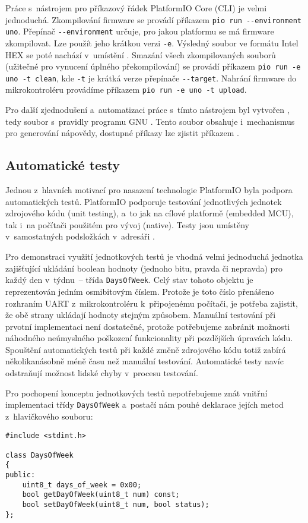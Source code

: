 Práce s~nástrojem pro příkazový řádek PlatformIO Core (CLI) je velmi
jednoduchá. Zkompilování firmware se provádí příkazem
\verb|pio run --environment uno|. Přepínač \verb|--environment| určuje,
pro jakou platformu se má firmware zkompilovat. Lze použít jeho krátkou verzi
\verb|-e|. Výsledný soubor ve formátu Intel HEX se poté nachází v~umístění
. Smazání všech zkompilovaných souborů
(užitečné pro vynucení úplného překompilování) se provádí příkazem
\verb|pio run -e uno -t clean|, kde \verb|-t| je krátká verze přepínače
\verb|--target|. Nahrání firmware do mikrokontroléru provádíme příkazem
\verb|pio run -e uno -t upload|.

Pro další zjednodušení a~automatizaci práce s~tímto nástrojem byl vytvořen
, tedy soubor s~pravidly programu GNU .
Tento soubor obsahuje i~mechanismus pro generování nápovědy, dostupné příkazy
lze zjistit příkazem .

\subsection{Automatické testy}
Jednou z~hlavních motivací pro nasazení technologie PlatformIO byla podpora
automatických testů. PlatformIO podporuje testování jednotlivých jednotek
zdrojového kódu \foreignlanguage{english}{(unit testing)}, %
a~to jak na cílové platformě (embedded MCU), tak i~na počítači použitém pro
vývoj (native). Testy jsou umístěny v~samostatných podsložkách v~adresáři
.

Pro demonstraci využití jednotkových testů je vhodná velmi jednoduchá jednotka
zajišťující ukládání boolean hodnoty (jednoho bitu, pravda či nepravda) pro
každý den v~týdnu~-- třída \texttt{DaysOfWeek}. Celý stav tohoto objektu je
reprezentován jedním osmibitovým číslem. Protože je toto číslo přenášeno
rozhraním UART z~mikrokontroléru k~připojenému počítači, je potřeba zajistit,
že obě strany ukládají hodnoty stejným způsobem. Manuální testování při prvotní
implementaci není dostatečné, protože potřebujeme zabránit možnosti náhodného
neúmyslného poškození funkcionality při pozdějších úpravách kódu. Spouštění
automatických testů při každé změně zdrojového kódu totiž zabírá
několikanásobně méně času než manuální testování. Automatické testy navíc
odstraňují možnost lidské chyby v~procesu testování.

Pro pochopení konceptu jednotkových testů nepotřebujeme znát vnitřní
implementaci třídy \texttt{DaysOfWeek} a~postačí nám pouhé deklarace jejích
metod z~hlavičkového souboru:
\begin{lstlisting}[language=myC++]
#include <stdint.h>

class DaysOfWeek
{
public:
    uint8_t days_of_week = 0x00;
    bool getDayOfWeek(uint8_t num) const;
    bool setDayOfWeek(uint8_t num, bool status);
};
\end{lstlisting}

